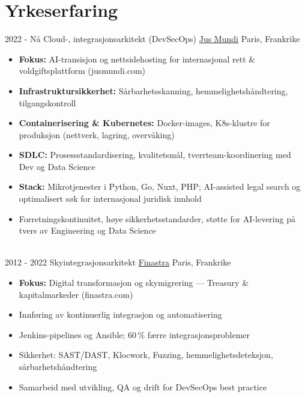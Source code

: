 \documentclass[letterpaper]{twentysecondcv} %
\begin{document}
\makeprofile %


\section{Yrkeserfaring}

\begin{twentytimeline}
	\twentyitemtimeline{\faCloud}
		{2022 -}
		{Nå}
		{Cloud-, integrasjonsarkitekt (DevSecOps)}
		{\href{https://www.jusmundi.com}{Jus Mundi}}
		{Paris, Frankrike}
		{\begin{itemize}
		\item \textbf{Fokus:} AI-transisjon og nettsidehosting for internasjonal rett \& voldgiftsplattform (jusmundi.com)
		\item \textbf{Infrastruktursikkerhet:} Sårbarhetsskanning, hemmelighetshåndtering, tilgangskontroll
		\item \textbf{Containerisering \& Kubernetes:} Docker-images, K8s-klustre for produksjon (nettverk, lagring, overvåking)
		\item \textbf{SDLC:} Prosessstandardisering, kvalitetsmål, tverrteam-koordinering med Dev og Data Science
		\item \textbf{Stack:} Mikrotjenester i Python, Go, Nuxt, PHP; AI-assisted legal search og optimalisert søk for internasjonal juridisk innhold
		\item Forretningskontinuitet, høye sikkerhetsstandarder, støtte for AI-levering på tvers av Engineering og Data Science
		\end{itemize}}
	\\
	\twentyitemtimeline{\faUsers}
		{2012 -}
		{2022}
		{Skyintegrasjonsarkitekt}
		{\href{https://finastra.com}{Finastra}}
		{Paris, Frankrike}
		{\begin{itemize}
		\item \textbf{Fokus:} Digital transformasjon og skymigrering — Treasury \& kapitalmarkeder (finastra.com)
		\item Innføring av kontinuerlig integrasjon og automatisering
		\item Jenkins-pipelines og Ansible; 60\,\% færre integrasjonsproblemer
		\item Sikkerhet: SAST/DAST, Klocwork, Fuzzing, hemmelighetsdeteksjon, sårbarhetshåndtering
		\item Samarbeid med utvikling, QA og drift for DevSecOps best practice

\end{itemize}}
\end{twentytimeline}
\end{document}
